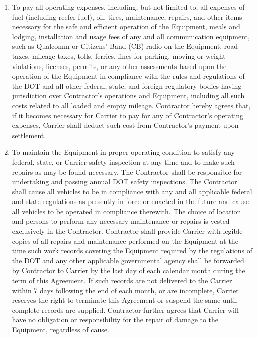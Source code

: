 {\begin{enumerate}[
        ref = \SecondLevelEnumerator
    ]
        \item To pay all operating expenses, including, but not limited to,
        all expenses of fuel (including reefer fuel), oil, tires,
        maintenance, repairs, and other items necessary for the safe and
        efficient operation of the Equipment, meals and lodging,
        installation and usage fees of any and all communication equipment,
        such as Qualcomm or Citizens' Band (CB) radio on the Equipment,
        road taxes, mileage taxes, tolls, ferries, fines for parking,
        moving or weight violations, licenses, permits, or any other
        assessments based upon the operation of the Equipment in compliance
        with the rules and regulations of the DOT and all other federal,
        state, and foreign regulatory bodies having jurisdiction over
        Contractor's operations and Equipment, including all such costs
        related to all loaded and empty mileage. Contractor hereby agrees
        that, if it becomes necessary for Carrier to pay for any of
        Contractor's operating expenses, Carrier shall deduct such cost
        from Contractor's payment upon settlement.
        
        \item To maintain the Equipment in proper operating condition to
        satisfy any federal, state, or Carrier safety inspection at any
        time and to make such repairs as may be found necessary. The
        Contractor shall be responsible for undertaking and passing annual
        DOT safety inspections. The Contractor shall cause all vehicles to
        be in compliance with any and all applicable federal and state
        regulations as presently in force or enacted in the future and
        cause all vehicles to be operated in compliance therewith. The
        choice of location and persons to perform any necessary maintenance
        or repairs is vested exclusively in the Contractor. Contractor
        shall provide Carrier with legible copies of all repairs and
        maintenance performed on the Equipment at the time such work
        records covering the Equipment required by the regulations of the
        DOT and any other applicable governmental agency shall be forwarded
        by Contractor to Carrier by the last day of each calendar month
        during the term of this Agreement. If such records are not
        delivered to the Carrier within 7 days following the end of each
        month, or are incomplete, Carrier reserves the right to terminate
        this Agreement or suspend the same until complete records are
        supplied. Contractor further agrees that Carrier will have no
        obligation or responsibility for the repair of damage to the
        Equipment, regardless of cause.


\end{enumerate}}
